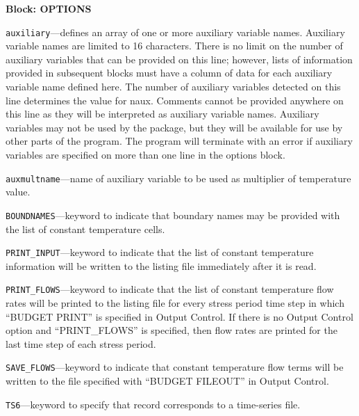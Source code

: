 
\item \textbf{Block: OPTIONS}

\begin{description}
\item \texttt{auxiliary}---defines an array of one or more auxiliary variable names.  Auxiliary variable names are limited to 16 characters.  There is no limit on the number of auxiliary variables that can be provided on this line; however, lists of information provided in subsequent blocks must have a column of data for each auxiliary variable name defined here.  The number of auxiliary variables detected on this line determines the value for naux.  Comments cannot be provided anywhere on this line as they will be interpreted as auxiliary variable names.  Auxiliary variables may not be used by the package, but they will be available for use by other parts of the program.  The program will terminate with an error if auxiliary variables are specified on more than one line in the options block.

\item \texttt{auxmultname}---name of auxiliary variable to be used as multiplier of temperature value.

\item \texttt{BOUNDNAMES}---keyword to indicate that boundary names may be provided with the list of constant temperature cells.

\item \texttt{PRINT\_INPUT}---keyword to indicate that the list of constant temperature information will be written to the listing file immediately after it is read.

\item \texttt{PRINT\_FLOWS}---keyword to indicate that the list of constant temperature flow rates will be printed to the listing file for every stress period time step in which ``BUDGET PRINT'' is specified in Output Control.  If there is no Output Control option and ``PRINT\_FLOWS'' is specified, then flow rates are printed for the last time step of each stress period.

\item \texttt{SAVE\_FLOWS}---keyword to indicate that constant temperature flow terms will be written to the file specified with ``BUDGET FILEOUT'' in Output Control.

\item \texttt{TS6}---keyword to specify that record corresponds to a time-series file.


\end{description}
